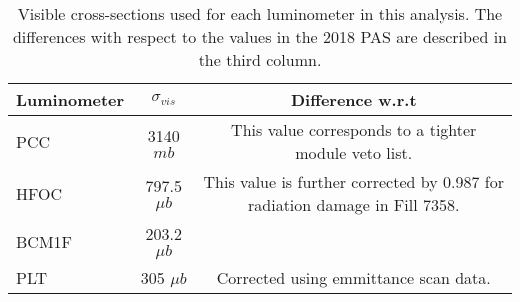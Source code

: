\vspace{24pt}
\begin{table}[h]
  \caption{Visible cross-sections used for each luminometer in this analysis. The differences with respect to the values in the 2018 PAS \cite{CMS-PAS-LUM-18-002} are described in the third column.}
  \label{tab:crossections}
    \begin{tabular}{l|c|c}
      \hline
      Luminometer & $\sigma_{vis}$ & Difference w.r.t \cite{CMS-PAS-LUM-18-002}\\
      \hline
      PCC   &  3140  $mb$     & This value corresponds to a tighter module veto list. \\
      HFOC  &  797.5 $\mu b$  & This value is further corrected by 0.987 for radiation damage in Fill 7358. \\
      BCM1F &  203.2 $\mu b$  &   \\
      PLT   &  305   $\mu b$  & Corrected using emmittance scan data. \\
      \hline\hline
    \end{tabular}
\end{table}
